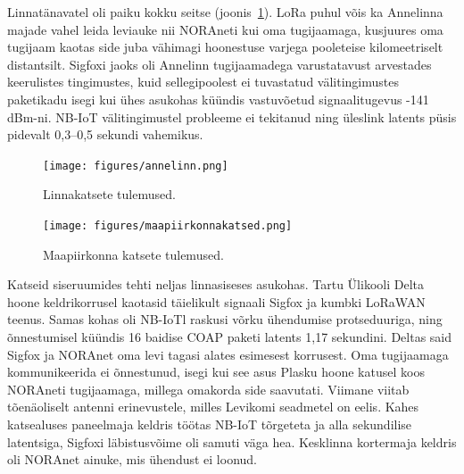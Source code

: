\documentclass[12pt]{article}
\begin{document}
    Linnatänavatel oli paiku kokku seitse (joonis~\ref{fig:annelinn}).
    LoRa puhul võis ka Annelinna majade vahel leida leviauke nii NORAneti kui oma tugijaamaga, kusjuures oma tugijaam kaotas side juba vähimagi hoonestuse varjega pooleteise kilomeetriselt distantsilt.
    Sigfoxi jaoks oli Annelinn tugijaamadega varustatavust arvestades keerulistes tingimustes, kuid sellegipoolest ei tuvastatud välitingimustes paketikadu isegi kui ühes asukohas küündis vastuvõetud signaalitugevus -141 dBm-ni.
    NB-IoT välitingimustel probleeme ei tekitanud ning üleslink latents püsis pidevalt 0,3--0,5 sekundi vahemikus.

    \begin{figure} [p]
        \begin{center}
            \vspace*{-0.5cm}
            \texttt{[image: figures/annelinn.png]}
            \caption{Linnakatsete tulemused.}
            \label{fig:annelinn}
        \end{center}
    \end{figure}

    \begin{figure} [p]
        \begin{center}
            \vspace*{-0.5cm}
            \texttt{[image: figures/maapiirkonnakatsed.png]}
            \caption{Maapiirkonna katsete tulemused.}
            \label{fig:maapiirkonnakatsed}
        \end{center}
    \end{figure}

    Katseid siseruumides tehti neljas linnasiseses asukohas.
    Tartu Ülikooli Delta hoone keldrikorrusel kaotasid täielikult signaali Sigfox ja kumbki LoRaWAN teenus.
    Samas kohas oli NB-IoTl raskusi võrku ühendumise protseduuriga, ning õnnestumisel küündis 16 baidise COAP paketi latents 1,17 sekundini.
    Deltas said Sigfox ja NORAnet oma levi tagasi alates esimesest korrusest.
    Oma tugijaamaga kommunikeerida ei õnnestunud, isegi kui see asus Plasku hoone katusel koos NORAneti tugijaamaga, millega omakorda side saavutati.
    Viimane viitab tõenäoliselt antenni erinevustele, milles Levikomi seadmetel on eelis.
    Kahes katsealuses paneelmaja keldris töötas NB-IoT tõrgeteta ja alla sekundilise latentsiga, Sigfoxi läbistusvõime oli samuti väga hea.
    Kesklinna kortermaja keldris oli NORAnet ainuke, mis ühendust ei loonud.
\end{document}
